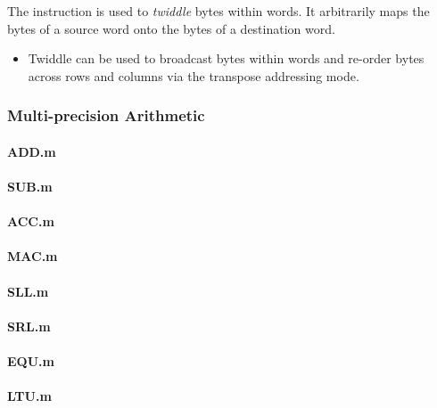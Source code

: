 The  instruction is used to {\em twiddle} bytes within words.
It arbitrarily maps the bytes of a source word onto the bytes of a
destination word.

\begin{itemize}
\item {}

Twiddle can be used to broadcast bytes within words and re-order bytes
across rows and columns via the transpose addressing mode.
\end{itemize}


\subsubsection{Multi-precision Arithmetic}
\paragraph{ADD.m}
\paragraph{SUB.m}
\paragraph{ACC.m}
\paragraph{MAC.m}
\paragraph{SLL.m}
\paragraph{SRL.m}
\paragraph{EQU.m}
\paragraph{LTU.m}
